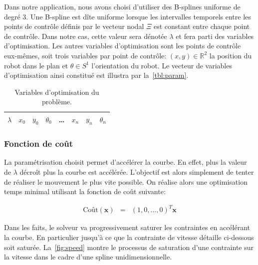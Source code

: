 Dans notre application, nous avons choisi d'utiliser des B-splines
uniforme de degré 3. Une B-spline est dîte uniforme lorsque les
intervalles temporels entre les points de contrôle définis par le
vecteur nodal $\Xi$ est constant entre chaque point de contrôle. Dans
notre cas, cette valeur sera dénotée $\lambda$ et fera parti des
variables d'optimisation. Les autres variables d'optimisation sont les
points de contrôle eux-mêmes, soit trois variables par point de
contrôle: $(x,y) \in \mathbb{R}^2$ la position du robot dans le plan
et $\theta \in S^1$ l'orientation du robot. Le vecteur de variables
d'optimisation ainsi constitué est illustra par
la~\autoref{tbl:param}.

\begin{table}[htbp]
  \begin{center}
\begin{tabular}{|l|l l l|l|l l l|}
  \hline
  $\lambda$
  & $x_0$ & $y_0$ & $\theta_0$
  & \ldots
  & $x_n$ & $y_n$ & $\theta_n$ \\
  \hline
\end{tabular}
  \end{center}
  \caption{Variables d'optimisation du problème. \label{tbl:param}}
\end{table}

\subsubsection{Fonction de coût}


La paramétrisation choisit permet d'accélérer la courbe. En effet,
plus la valeur de $\lambda$ décroît plus la courbe est
accélérée. L'objectif est alors simplement de tenter de réaliser le
mouvement le plus vite possible. On réalise alors une optimisation
temps minimal utilisant la fonction de coût
suivante:

\begin{eqnarray}
\text{Coût}(\mathbf{x}) & = & (1, 0, \dotsc, 0)^T \mathbf{x}
\end{eqnarray}

Dans les faits, le solveur va progressivement saturer les contraintes
en accélérant la courbe. En particulier jusqu'à ce que la contrainte
de vitesse détaille ci-dessous soit saturée. La~\autoref{fig:speed}
montre le processus de saturation d'une contrainte sur la vitesse dans
le cadre d'une spline unidimensionnelle.

